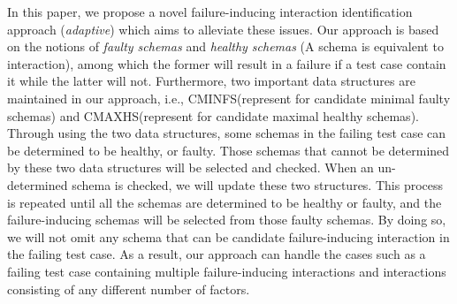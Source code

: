 \documentclass[10pt,journal,cspaper,compsoc]{IEEEtran}
\begin{document}
%

In this paper, we propose a novel failure-inducing interaction identification approach (\emph{adaptive}) which aims to alleviate these issues.
Our approach is based on the notions of \emph{faulty schemas} and \emph{healthy schemas} (A schema is equivalent to interaction), among which the former will result in a failure if a test case contain it while the latter will not. Furthermore, two important data structures are maintained in our approach, i.e., CMINFS(represent for candidate minimal faulty schemas) and CMAXHS(represent for candidate maximal healthy schemas). Through using the two data structures, some schemas in the failing test case can be determined to be healthy, or faulty. Those schemas that cannot be determined by these two data structures will be selected and checked. When an un-determined schema is checked, we will update these two structures. This process is repeated until all the schemas are determined to be healthy or faulty, and the failure-inducing schemas will be selected from those faulty schemas. By doing so, we will not omit any schema that can be candidate failure-inducing interaction in the failing test case. As a result, our approach can handle the cases such as a failing test case containing multiple failure-inducing interactions and interactions consisting of any different number of factors.
\end{document}
